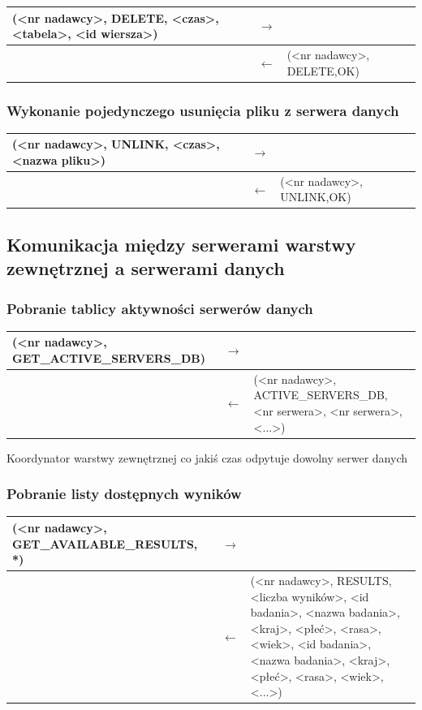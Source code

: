 \begin{longtable}{| p{} | p{}| p{} |} 
\hline
(<nr nadawcy>, DELETE, <czas>, <tabela>, <id wiersza>) & $\rightarrow$ &  \\ \hline
 & $\leftarrow$ & (<nr nadawcy>, DELETE,OK) \\ \hline
\end{longtable}

\subsubsection{Wykonanie pojedynczego usunięcia pliku z serwera danych}

\begin{longtable}{| p{} | p{}| p{} |} 
\hline
(<nr nadawcy>, UNLINK, <czas>, <nazwa pliku>) & $\rightarrow$ &  \\ \hline
 & $\leftarrow$ & (<nr nadawcy>, UNLINK,OK) \\ \hline
\end{longtable}

\subsection{Komunikacja między serwerami warstwy zewnętrznej a serwerami danych}

\subsubsection{Pobranie tablicy aktywności serwerów danych}

\begin{longtable}{| p{} | p{}| p{} |} 
\hline
(<nr nadawcy>, GET\_ACTIVE\_SERVERS\_DB) & $\rightarrow$ &  \\ \hline
 & $\leftarrow$ & (<nr nadawcy>, ACTIVE\_SERVERS\_DB, <nr serwera>, <nr serwera>, <...>) \\ \hline
\end{longtable}
Koordynator warstwy zewnętrznej co jakiś czas odpytuje dowolny serwer danych

\subsubsection{Pobranie listy dostępnych wyników}

\begin{longtable}{| p{} | p{}| p{} |} 
\hline
(<nr nadawcy>, GET\_AVAILABLE\_RESULTS, *) & $\rightarrow$ &  \\ \hline
 & $\leftarrow$ & (<nr nadawcy>, RESULTS, <liczba wyników>, <id badania>, <nazwa badania>, <kraj>, <płeć>, <rasa>, <wiek>, <id badania>, <nazwa badania>, <kraj>, <płeć>, <rasa>, <wiek>, <...>) \\ \hline
\end{longtable}

